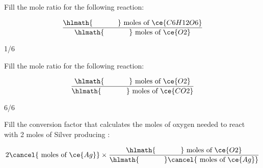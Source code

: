 \documentclass[main.tex]{subfiles}
\begin{document}
\begin{multicols*}{2}
\begin{question}[ID=\the\value{numA}]
Fill the mole ratio for the following reaction:
\begin{center}\end{center}
\begin{equation*}
\frac{\hlmath{\hspace{35pt}}\text{ moles of }\ce{C6H12O6}}{\hlmath{\hspace{35pt}}\text{ moles of }\ce{O2}} 
\end{equation*}
\end{question}
\begin{solution}
 1/6
\hspace{0.1cm}\end{solution}%
\begin{question}[ID=\the\value{numA}]
Fill the mole ratio for the following reaction:
\begin{center}\end{center}
\begin{equation*}
\frac{\hlmath{\hspace{35pt}}\text{ moles of }\ce{O2}}{\hlmath{\hspace{35pt}}\text{ moles of }\ce{CO2}} 
\end{equation*}
\end{question}
\begin{solution}
 6/6
\hspace{0.1cm}\end{solution}%
\begin{question}[ID=\the\value{numA}]
Fill the conversion factor that calculates the moles of oxygen needed to react with 2 moles of Silver producing :
\begin{center}\end{center}
 \begin{equation*}\begin{split}
2\cancel{\text{ moles of }\ce{Ag}} \times \dfrac{\hlmath{\hspace{35pt}}\text{ moles of }\ce{O2}}{\hlmath{\hspace{35pt}}\cancel{\text{ moles of }\ce{Ag}}}\\

\end{split}
\end{equation*}
\end{question}
\end{multicols*}
\end{document}
